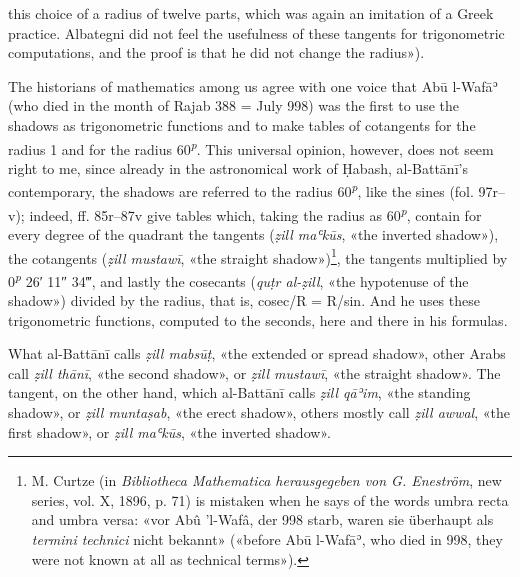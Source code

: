 \documentclass[11pt]{article}
\begin{document}
this choice of a radius of twelve parts, which was again an imitation of a Greek practice. Albategni did not feel the usefulness of these tangents for trigonometric computations, and the proof is that he did not change the radius»).\par
\par The historians of mathematics among us agree with one voice that Abū l-Wafāʾ (who died in the month of Rajab 388 = July 998) was the first to use the shadows as trigonometric functions and to make tables of cotangents for the radius 1 and for the radius 60\textsuperscript{\itshape p}. This universal opinion, however, does not seem right to me, since already in the astronomical work of Ḥabash, al-Battānī's contemporary, the shadows are referred to the radius 60\textsuperscript{\itshape p}, like the sines (fol. 97r–v); indeed, ff. 85r–87v give tables which, taking the radius as 60\textsuperscript{\itshape p}, contain for every degree of the quadrant the tangents (\emph{ẓill maʿkūs}, «the inverted shadow»), the cotangents (\emph{ẓill mustawī}, «the straight shadow»)\footnote{M. Curtze (in \emph{Bibliotheca Mathematica herausgegeben von G. Eneström}, new series, vol. X, 1896, p. 71) is mistaken when he says of the words umbra recta and umbra versa: «vor Abû ’l-Wafâ, der 998 starb, waren sie überhaupt als \emph{termini technici} nicht bekannt» («before Abū l-Wafāʾ, who died in 998, they were not known at all as technical terms»).}, the tangents multiplied by 0\textsuperscript{\itshape p} 26′ 11″ 34‴, and lastly the cosecants (\emph{quṭr al-ẓill}, «the hypotenuse of the shadow») divided by the radius, that is, cosec/R = R/sin. And he uses these trigonometric functions, computed to the seconds, here and there in his formulas.\par
\par What al-Battānī calls \emph{ẓill mabsūṭ}, «the extended or spread shadow», other Arabs call \emph{ẓill thānī}, «the second shadow», or \emph{ẓill mustawī}, «the straight shadow». The tangent, on the other hand, which al-Battānī calls \emph{ẓill qāʾim}, «the standing shadow», or \emph{ẓill muntaṣab}, «the erect shadow», others mostly call \emph{ẓill awwal}, «the first shadow», or \emph{ẓill maʿkūs}, «the inverted shadow».\par
\end{document}
